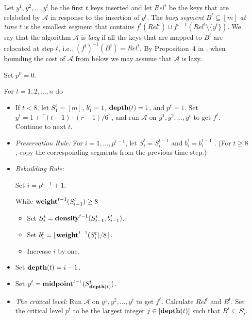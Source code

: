 \documentclass[11pt]{article}
\newcommand{\A}{\mathcal{A}}
\newcommand{\weight}{{\rm {\bf weight}}}
\newcommand{\midp}{{\rm {\bf midpoint}}}
\newcommand{\depth}{{\rm {\bf depth}}}
\newcommand{\densify}{{\rm {\bf densify}}}
\begin{document}
Let $y^1,y^2,\dotsc,y^t$ be the first $t$ keys inserted  and let $Rel^t$ be the keys
that are relabeled by
$\A$ in response to the insertion of $y^t$. The \emph{busy segment $B^t\subseteq [m]$ at time $t$} is
the smallest segment that contains $f^t(Rel^t)\cup f^{t-1}(Rel^t \setminus \{y^t\})$.
We say that the algorithm $\A$ is \emph{lazy} if
all the keys that are mapped to $B^t$ are relocated at step $t$, i.e., $(f^t)^{-1}(B^t) = Rel^t$.
By Proposition~4 in \cite{BKS}, when bounding the cost of $\A$ from below
we may assume that $\A$ is lazy.

\medskip\noindent {\bf Adversary($\A,n,m,r$)}

\smallskip\noindent Set $p^0=0$.

\smallskip\noindent For $t=1,2,\dotsc,n$ do
\begin{itemize}
\item
If $t < 8$, let $S^t_1 = [m]$, $b^t_1=1$, $\depth(t)=1$, and $p^{t}=1$.
Set $y^t = 1 + \lceil (t-1) \cdot (r-1)/6 \rceil$, and run $\A$ on $y^1,y^2,\dotsc,y^t$ to get $f^t$.
Continue to next $t$.

\item
\emph{Preservation Rule:}
For $i=1,\dotsc,p^{t-1}$, let $S^t_i=S^{t-1}_{i}$ and $b^t_i=b^{t-1}_i$ .
(For $t\ge 8$, copy the corresponding segments from the previous time step.)

\item
\emph{Rebuilding Rule:}

Set $i=p^{t-1}+1$.

While $\weight^{t-1}(S^t_{i-1}) \ge 8$

\begin{itemize}
\item Set $S^t_i = \densify^{t-1}(S^t_{i-1},b^t_{i-1})$.
\item Set $b^t_i = \lceil \weight^{t-1}(S^t_i)/8 \rceil$.
\item Increase $i$ by one.
\end{itemize}

\item
Set $\depth(t)=i-1$.

\item
Set $y^t = \midp^{t-1}(S^t_{\depth(t)})$.

\item
\emph{The critical level:}
Run $\A$ on $y^1,y^2,\dotsc,y^t$ to get $f^t$. Calculate $Rel^t$ and $B^t$.
Set the critical level $p^{t}$ to be the largest integer $j\in [\depth(t)]$ such that $B^{t} \subseteq S^{t}_j$.

\end{itemize}
\end{document}
